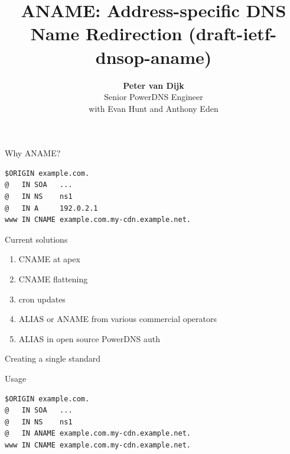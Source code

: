 \documentclass{beamer}
\title[aname]{ANAME: Address-specific DNS Name Redirection (draft-ietf-dnsop-aname)}
\author{\textbf{Peter van Dijk}\\Senior PowerDNS Engineer\\with Evan Hunt and Anthony Eden}
\date{}
\begin{document}
\begin{frame}
  \titlepage
\end{frame}

\begin{frame}[fragile]{Why ANAME?}
  \begin{verbatim}
$ORIGIN example.com.
@   IN SOA   ...
@   IN NS    ns1
@   IN A     192.0.2.1
www IN CNAME example.com.my-cdn.example.net.
  \end{verbatim}
\end{frame}

\begin{frame}{Current solutions}
  \begin{enumerate}
    \item CNAME at apex
    \item CNAME flattening
    \item cron updates
    \item ALIAS or ANAME from various commercial operators
    \item ALIAS in open source PowerDNS auth
  \end{enumerate}
\end{frame}

\begin{frame}{Creating a single standard}
\end{frame}

\begin{frame}[fragile]{Usage}
  \begin{verbatim}
$ORIGIN example.com.
@   IN SOA   ...
@   IN NS    ns1
@   IN ANAME example.com.my-cdn.example.net.
www IN CNAME example.com.my-cdn.example.net.
  \end{verbatim}
\end{frame}
\end{document}
